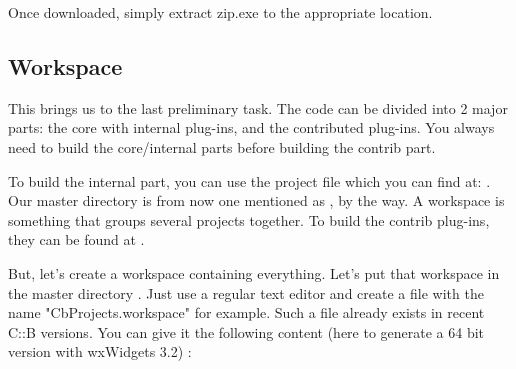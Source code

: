 Once downloaded, simply extract zip.exe to the appropriate location.

\subsection{Workspace}
This brings us to the last preliminary task. The \codeblocks code can be divided into 2 major parts: the core with internal plug-ins, and the contributed plug-ins. You always need to build the core/internal parts before building the contrib part.

To build the internal part, you can use the \codeblocks project file which you can find at: . Our \codeblocks master directory is from now one mentioned as , by the way. A workspace is something that groups several projects together. To build the contrib plug-ins, they can be found at .

But, let's create a workspace containing everything. Let's put that workspace in the master directory . Just use a regular text editor and create a file with the name "CbProjects.workspace" for example. Such a file already exists in recent C::B versions. You can give it the following content (here to generate a 64 bit version with wxWidgets 3.2) : 

